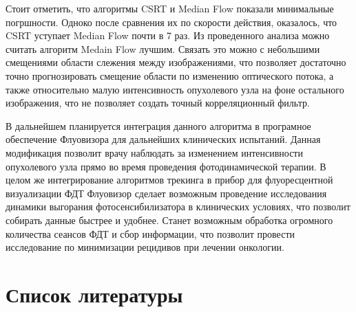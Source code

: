 \documentclass[a4paper,14pt]{extarticle}
\begin{document}
Стоит отметить, что алгоритмы CSRT и Median Flow показали минимальные погршности. Одноко после сравнения их по скорости действия, оказалось, что CSRT уступает Median Flow почти в 7 раз. Из проведенного анализа можно считать алгоритм Medain Flow лучшим. Связать это можно с небольшими смещениями области слежения между изображениями, что позволяет достаточно точно прогнозировать смещение области по изменению оптического потока, а также относительно малую интенсивность опухолевого узла на фоне остального изображения, что не позволяет создать точный корреляционный фильтр. 

В дальнейшем планируется интеграция данного алгоритма в програмное обеспечение Флуовизора для дальнейших клинических испытаний. Данная модификация позволит врачу наблюдать за изменением интенсивности опухолевого узла прямо во время проведения фотодинамической терапии. В целом же интегрирование алгоритмов трекинга в прибор для флуоресцентной визуализации ФДТ Флуовизор сделает возможным проведение исследования динамики выгорания фотосенсибилизатора в клинических условиях, что позволит собирать данные быстрее и удобнее. Станет возможным обработка огромного количества сеансов ФДТ и сбор информации, что позволит провести исследование по минимизации рецидивов при лечении онкологии.


\newpage
\section{Список литературы}
\end{document}

